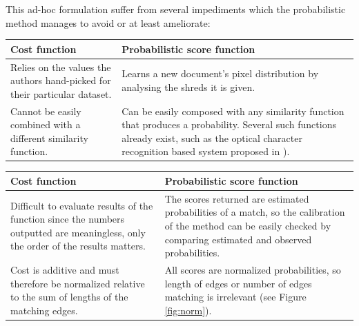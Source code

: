 This ad-hoc formulation suffer from several impediments which the probabilistic method manages to avoid or at least ameliorate: \\
\begin{table}[H]
  \centering
  \begin{tabular}{p{} | p{}}
  \toprule
  Cost function & Probabilistic score function \\
  \midrule
Relies on the values the authors hand-picked for their particular dataset. & Learns a new document's pixel distribution by analysing the shreds it is given.\vspace{1.5em} \\
Cannot be easily combined with a different similarity function. & Can be easily composed with any similarity function that produces a probability. Several such functions already exist, such as the optical character recognition based system proposed in \cite{P8}). \\ 
  \bottomrule
  \end{tabular}
  \label{tab:costScoreComp}
\end{table}
\begin{table}[H]
  \centering
  \begin{tabular}{p{} | p{}}
  \toprule
  Cost function & Probabilistic score function \\ 
  \midrule
Difficult to evaluate results of the function since the numbers outputted are meaningless, only the order of the results matters. & The scores returned are estimated probabilities of a match, so the calibration of the method can be easily checked by comparing estimated and observed probabilities. \vspace{1.5em} \\ 
Cost is additive and must therefore be normalized relative to the sum of lengths of the matching edges. & All scores are normalized probabilities, so length of edges or number of edges matching is irrelevant (see Figure \ref{fig:norm}).  \\ 
  \bottomrule
  \end{tabular}
  \label{tab:costScoreComp}
\end{table}
